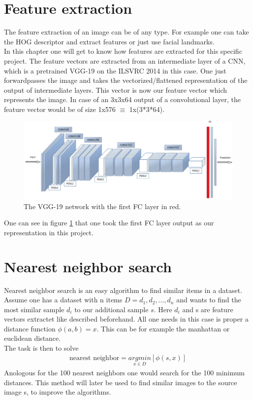 \documentclass[
     11pt,         %
     a4paper,      %
     oneside,
     ]{article}
\begin{document}
\section{Feature extraction}
The feature extraction of an image can be of any type. For example one can take the HOG descriptor and extract features or just use facial landmarks.\\
In this chapter one will get to know how features are extracted for this specific project.
The feature vectors are extracted from an intermediate layer of a CNN, which is a pretrained VGG-19 on the ILSVRC 2014 in this case.
One just forwardpasses the image and takes the vectorized/flattened representation of the output of intermediate layers.
This vector is now our feature vector which represents the image. In case of an 3x3x64 output of a convolutional layer, the feature vector would be of size 1x576 $\equiv$ 1x(3*3*64).\\
\begin{figure}[H]
  \begin{center}
    \includegraphics[width=1.0\textwidth]{images/VGG19.png}
    \caption{The VGG-19 network with the first FC layer in red.}
    \label{fig:VGG19}
  \end{center}
\end{figure}
One can see in figure \ref{fig:VGG19} that one took the first FC layer output as our representation in this project.


\section{Nearest neighbor search}
Nearest neighbor search is an easy algorithm to find similar items in a dataset. Assume one has a dataset with n items $D = {d_1, d_2, ..., d_n}$ and wants to find the most similar sample $d_i$ to our additional sample $s$. Here $d_i$ and s are feature vectors extractet like described beforehand. All one needs in this case is proper a distance function $\phi(a,b) = x$. This can be for example the manhattan or euclidean distance. \\
The task is then to solve
\begin{align*}
  \text{nearest neighbor} = \underset{x \in D}{argmin} [\phi(s,x)]
\end{align*}
Anologous for the 100 nearest neighbors one would search for the 100 minimum distances. This method will later be used to find similar images to the source image s, to improve the algorithms.
\end{document}
